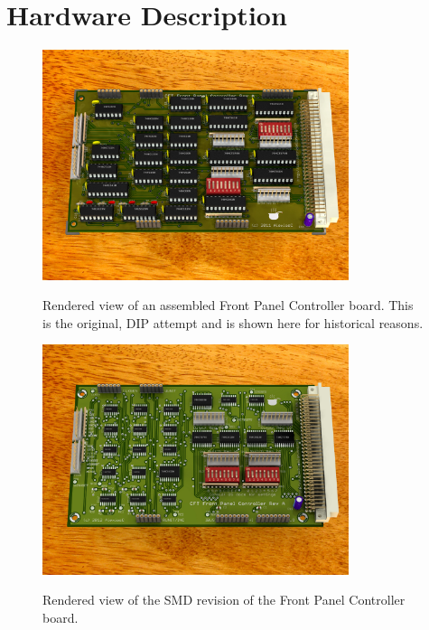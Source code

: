 \documentclass[11pt,a4paper,twocolumns]{article}
\newcommand\abbr[1]{#1}
\begin{document}
\section{Hardware Description}

\begin{figure}
\centering
\includegraphics[width=0.8\textwidth]{figs/front-panel-controller-dip.jpg}\\
\caption{\label{fig-rendered-fpc-dip}Rendered view of an assembled Front Panel
  Controller board. This is the original, \abbr{DIP} attempt and is shown here for
  historical reasons.}
\end{figure}

\begin{figure}
\centering
\includegraphics[width=0.8\textwidth]{figs/front-panel-controller-smd.jpg}\\
\caption{\label{fig-rendered-fpc-smd}Rendered view of the \abbr{SMD} revision of the
  Front Panel Controller board.}
\end{figure}
\end{document}

